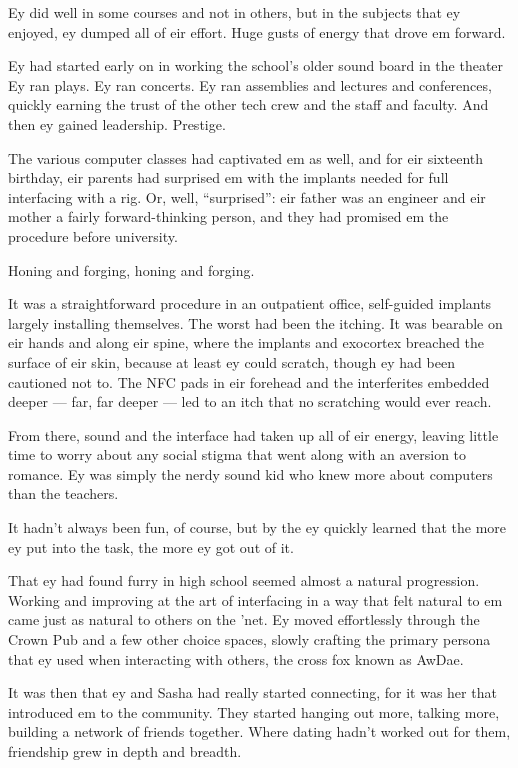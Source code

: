 Ey did well in some courses and not in others, but in the subjects that ey enjoyed, ey dumped all of eir effort. Huge gusts of energy that drove em forward.

Ey had started early on in working the school's older sound board in the theater Ey ran plays. Ey ran concerts. Ey ran assemblies and lectures and conferences, quickly earning the trust of the other tech crew and the staff and faculty. And then ey gained leadership. Prestige.

The various computer classes had captivated em as well, and for eir sixteenth birthday, eir parents had surprised em with the implants needed for full interfacing with a rig. Or, well, ``surprised'': eir father was an engineer and eir mother a fairly forward-thinking person, and they had promised em the procedure before university.

Honing and forging, honing and forging.

It was a straightforward procedure in an outpatient office, self-guided implants largely installing themselves. The worst had been the itching. It was bearable on eir hands and along eir spine, where the implants and exocortex breached the surface of eir skin, because at least ey could scratch, though ey had been cautioned not to. The NFC pads in eir forehead and the interferites embedded deeper --- far, far deeper --- led to an itch that no scratching would ever reach.

From there, sound and the interface had taken up all of eir energy, leaving little time to worry about any social stigma that went along with an aversion to romance. Ey was simply the nerdy sound kid who knew more about computers than the teachers.

It hadn't always been fun, of course, but by the ey quickly learned that the more ey put into the task, the more ey got out of it.

That ey had found furry in high school seemed almost a natural progression. Working and improving at the art of interfacing in a way that felt natural to em came just as natural to others on the 'net. Ey moved effortlessly through the Crown Pub and a few other choice spaces, slowly crafting the primary persona that ey used when interacting with others, the cross fox known as AwDae.

It was then that ey and Sasha had really started connecting, for it was her that introduced em to the community. They started hanging out more, talking more, building a network of friends together. Where dating hadn't worked out for them, friendship grew in depth and breadth.

